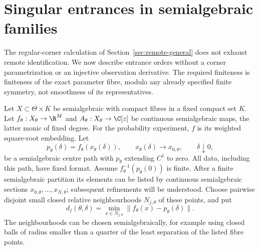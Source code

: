 \section{Singular entrances in semialgebraic families}\label{sec:singular-entrances}
The regular-corner calculation of Section~\ref{sec:remote-general} does
not exhaust remote identification. We now describe entrance orders
without a corner parametrization or an injective observation derivative.
The required finiteness is finiteness of the exact parameter fibre,
modulo any already specified finite symmetry, not smoothness of its
representatives.

Let $X\subset\Theta\times K$ be semialgebraic with compact fibres in a
fixed compact set $K$. Let $f_\theta:X_\theta\to\R^M$ and
$A_\theta:X_\theta\to\C[z]$ be continuous semialgebraic maps, the latter
monic of fixed degree. For the probability experiment, $f$ is its
weighted square-root embedding. Let
\[
 p_\theta(\delta)=f_\theta(x_\theta(\delta)),\qquad
 x_\theta(\delta)\longrightarrow x_{0,\theta},\qquad \delta\downarrow0,
\]
be a semialgebraic centre path with $p_\theta$ extending $C^1$ to zero.
All data, including this path, have fixed format. Assume
$f_\theta^{-1}(p_\theta(0))$ is finite. After a finite semialgebraic
partition its elements can be listed by continuous semialgebraic
sections $x_{0,\theta},\ldots,x_{N,\theta}$; subsequent refinements
will be understood. Choose pairwise disjoint small closed relative
neighbourhoods $N_{j,\theta}$ of these points, and put
\begin{equation}\label{eq:singular-distance}
 d_j(\theta,\delta)=\min_{x\in N_{j,\theta}}
              \|f_\theta(x)-p_\theta(\delta)\|.
\end{equation}
The neighbourhoods can be chosen semialgebraically, for example using
closed balls of radius smaller than a quarter of the least separation of
the listed fibre points.

